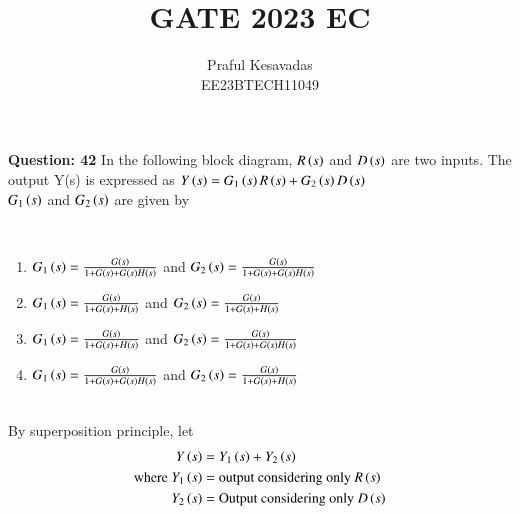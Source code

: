\documentclass[journal,12pt,onecolumn]{IEEEtran}
\theoremstyle{remark}
\begin{document}
\let\vec\mathbf







\bigskip

\renewcommand{\thefigure}{\theenumi}
\renewcommand{\thetable}{\theenumi}


\title{GATE 2023 EC}
\author{Praful Kesavadas\\ EE23BTECH11049}
\maketitle

\textbf{Question: 42} In the following block diagram, $R\left(s\right)$ and $D\left(s\right)$ are two inputs. The output Y(s) is expressed as $Y\left(s\right) = G_1\left(s\right)R\left(s\right) + G_2\left(s\right)D\left(s\right)$\\
$G_1\left(s\right)$ and $G_2\left(s\right)$ are given by\\
\begin{figure}[htbp!]
\centering

\end{figure}\\
\begin{enumerate}[label=\alph*)]
\item $G_1\left(s\right) = \frac{G\left(s\right)}{1+G\left(s\right)+G\left(s\right)H\left(s\right)}$ and $G_2\left(s\right) = \frac{G\left(s\right)}{1+ G\left(s\right)+G\left(s\right)H\left(s\right)}$\\
\item $G_1\left(s\right) = \frac{G\left(s\right)}{1+G\left(s\right)+H\left(s\right)}$ and $G_2\left(s\right) = \frac{G\left(s\right)}{1+ G\left(s\right)+H\left(s\right)}$\\
\item $G_1\left(s\right) = \frac{G\left(s\right)}{1+G\left(s\right)+H\left(s\right)}$ and $G_2\left(s\right) = \frac{G\left(s\right)}{1+ G\left(s\right)+G\left(s\right)H\left(s\right)}$\\
\item $G_1\left(s\right) = \frac{G\left(s\right)}{1+G\left(s\right)+G\left(s\right)H\left(s\right)}$ and $G_2\left(s\right) = \frac{G\left(s\right)}{1+ G\left(s\right)+H\left(s\right)}$\\
\end{enumerate}
\solution\\
By superposition principle, let\\ 
\begin{align*}Y\left(s\right)&= Y_1\left(s\right) + Y_2\left(s\right)\\ \text{where } Y_1\left(s\right)&= \text{output considering only } R\left(s\right)\\ Y_2\left(s\right) &= \text{Output considering only } D\left(s\right)
\end{align*}
\end{document}
